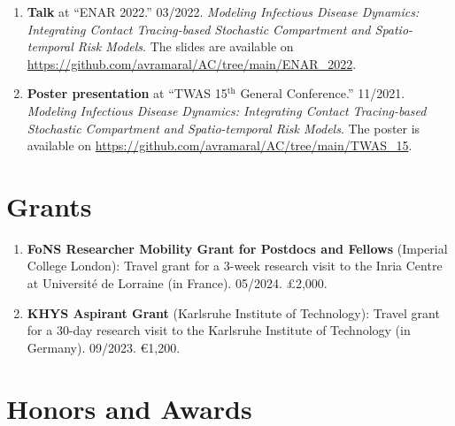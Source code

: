 \documentclass[10pt, ]{article}
\begin{document}
\begin{enumerate}[noitemsep, topsep=0pt]
		\item \textbf{Talk} at ``ENAR 2022.'' 03/2022. \textit{Modeling Infectious Disease Dynamics: Integrating Contact Tracing-based	Stochastic Compartment and Spatio-temporal Risk Models}. The slides are available on \href{https://github.com/avramaral/AC/tree/main/ENAR\_2022}{\url{https://github.com/avramaral/AC/tree/main/ENAR\_2022}}.
		
		\item \textbf{Poster presentation} at ``TWAS 15${}^{\text{th}}$ General Conference.'' 11/2021. \textit{Modeling Infectious Disease Dynamics: Integrating Contact Tracing-based	Stochastic Compartment and Spatio-temporal Risk Models}. The poster is available on \href{https://github.com/avramaral/AC/tree/main/TWAS\_15}{\url{https://github.com/avramaral/AC/tree/main/TWAS\_15}}.
	\end{enumerate}
	
	\vspace{10pt}

	\vspace{-12pt}
	\section*{Grants} \vspace{-5pt}
	
	\begin{enumerate}[noitemsep, topsep=0pt]
		\item \textbf{FoNS Researcher Mobility Grant for Postdocs and Fellows} (Imperial College London): Travel grant for a 3-week research visit to the Inria Centre at Université de Lorraine (in France). \hspace{-1pt}05/2024. \hspace{-1pt}£2,000.
		
		\item \textbf{KHYS Aspirant Grant} (Karlsruhe Institute of Technology): Travel grant for a 30-day research visit to the Karlsruhe Institute of Technology (in Germany). 09/2023. €1,200.
	\end{enumerate}
	
	\vspace{10pt}
	
	\vspace{-12pt}
	\section*{Honors and Awards} \vspace{-5pt}
	
\end{document}
